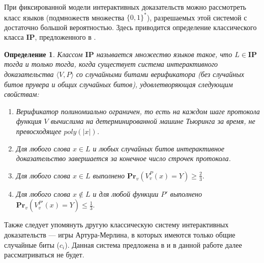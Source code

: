 \documentclass[14pt, a4paper]{extreport}
\newtheorem{definition}{\indent Определение}
\newcommand{\word}{\{0, 1\}^*}
\newcommand{\poly}{\textit{poly}}
\newcommand{\pr}[2]{\textbf{Pr}_{#1}\left(#2\right)}
\begin{document}
При фиксированной модели интерактивных доказательств можно рассмотреть класс языков (подмножеств множества $\word$), разрешаемых этой системой с достаточно большой вероятностью. Здесь приводится определение классического класса $\textbf{IP}$, предложенного в \cite{goldwasser1989ip}.
\begin{definition}\label{ip}
    Классом $\textbf{IP}$ называется множество языков такое, что $L \in \textbf{IP}$ тогда и только тогда, когда существует система интерактивного доказательства $\langle V, P\rangle$ со случайными битами верификатора (без случайных битов прувера и общих случайных битов), удовлетворяющая следующим свойствам:
    \begin{enumerate}
        \item Верификатор полиномиально ограничен, то есть на каждом шаге протокола функция $V$ вычислима на детерминированной машине Тьюринга за время, не превосходящее $\poly(|x|)$.
        \item Для любого слова $x \in L$ и любых случайных битов интерактивное доказательство завершается за конечное число строчек протокола.
        \item Для любого слова $x \in L$ выполнено $\pr{v}{V^P_{v}(x) = Y} \geqslant \frac{2}{3}.$
        \item Для любого слова $x \notin L$ и для любой функции $P'$ выполнено\\$\pr{v}{V^{P'}_{v}(x) = Y} \leqslant \frac{1}{3}.$
    \end{enumerate}
\end{definition}
Также следует упомянуть другую классическую систему интерактивных доказательств --- игры Артура-Мерлина, в которых имеются только общие случайные биты ($c_{i}$). Данная система предложена в \cite{babai1988arthur} и в данной работе далее рассматриваться не будет.
\end{document}
